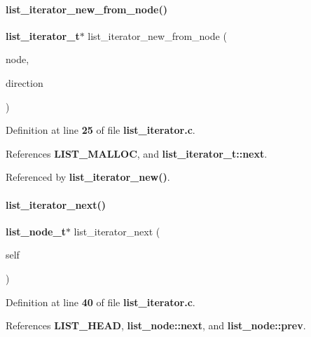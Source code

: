 \mbox{\label{list_8h_af4136a8a27bdc8c0f967a708dd03d575}} 
\paragraph{list\+\_\+iterator\+\_\+new\+\_\+from\+\_\+node()}
{\footnotesize\ttfamily \textbf{ list\+\_\+iterator\+\_\+t}$\ast$ list\+\_\+iterator\+\_\+new\+\_\+from\+\_\+node (\begin{DoxyParamCaption}\item[{\textbf{ list\+\_\+node\+\_\+t} $\ast$}]{node,  }\item[{\textbf{ list\+\_\+direction\+\_\+t}}]{direction }\end{DoxyParamCaption})}



Definition at line \textbf{ 25} of file \textbf{ list\+\_\+iterator.\+c}.



References \textbf{ L\+I\+S\+T\+\_\+\+M\+A\+L\+L\+OC}, and \textbf{ list\+\_\+iterator\+\_\+t\+::next}.



Referenced by \textbf{ list\+\_\+iterator\+\_\+new()}.

\mbox{\label{list_8h_a2e5db981e32d3aef49ea79505a0615a6}} 
\paragraph{list\+\_\+iterator\+\_\+next()}
{\footnotesize\ttfamily \textbf{ list\+\_\+node\+\_\+t}$\ast$ list\+\_\+iterator\+\_\+next (\begin{DoxyParamCaption}\item[{\textbf{ list\+\_\+iterator\+\_\+t} $\ast$}]{self }\end{DoxyParamCaption})}



Definition at line \textbf{ 40} of file \textbf{ list\+\_\+iterator.\+c}.



References \textbf{ L\+I\+S\+T\+\_\+\+H\+E\+AD}, \textbf{ list\+\_\+node\+::next}, and \textbf{ list\+\_\+node\+::prev}.



